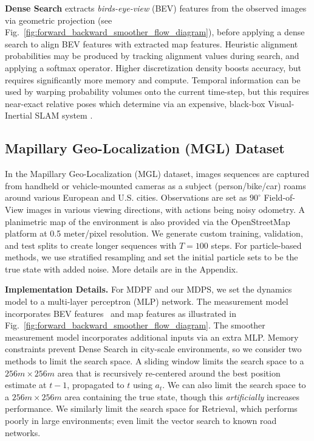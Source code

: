             \textbf{Dense Search} \citep{sarlin2023orienternet} extracts \emph{birds-eye-view} (BEV) features from the observed images via geometric projection (see Fig.~\ref{fig:forward_backward_smoother_flow_diagram}), before applying a dense search to align BEV features with extracted map features.  Heuristic alignment probabilities may be produced by tracking alignment values during search, and applying a softmax operator.  Higher discretization density boosts accuracy, but requires significantly more memory and compute. Temporal information can be used by warping probability volumes onto the current time-step, but this requires near-exact relative poses which \citet{sarlin2023orienternet} determine via an expensive, black-box Visual-Inertial SLAM system \cite{probabilistic_robotics}. %

           
            
        \subsection{Mapillary Geo-Localization (MGL) Dataset}
            In the Mapillary Geo-Localization (MGL) \cite{sarlin2023orienternet} dataset, images sequences are captured from handheld or vehicle-mounted cameras as a subject (person/bike/car) roams around various European and U.S. cities. Observations are set as $90^{\circ}$ Field-of-View images in various viewing directions, with actions being noisy odometry. A planimetric map of the environment is also provided via the OpenStreetMap platform \cite{OpenStreetMap} at 0.5 meter/pixel resolution. %
            We generate custom training, validation, and test splits to create longer sequences with $T=100$ steps. For particle-based methods, we use stratified resampling and set the initial particle sets to be the true state with added noise. More details are in the Appendix.

            \textbf{Implementation Details.} For MDPF and our MDPS, we set the dynamics model to a multi-layer perceptron (MLP) network.  The measurement model incorporates BEV features~\citep{sarlin2023orienternet} and map features as illustrated in Fig.~\ref{fig:forward_backward_smoother_flow_diagram}. The smoother measurement model incorporates additional inputs via an extra MLP. Memory constraints prevent Dense Search in city-scale environments, so we consider two methods to limit the search space. A sliding window limits the search space to a $256 m \times 256 m$ area that is recursively re-centered around the best position estimate at $t-1$, propagated to $t$ using $a_t$. We can also limit the search space to a $256 m \times 256 m$ area containing the true state, though this \emph{artificially} increases performance. We similarly limit the search space for Retrieval, which performs poorly in large environments; \citet{9635972GausePF} even limit the vector search to known road networks. %
            
